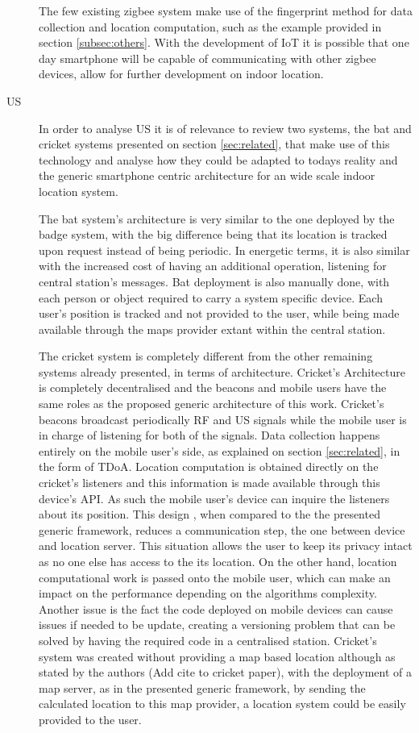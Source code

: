 \begin{description}
	The few existing zigbee system make use of the fingerprint method for data collection and location computation, such as the example provided in section \ref{subsec:others}. With the development of IoT it is possible that one day smartphone will be capable of communicating with other zigbee devices, allow for further development on indoor location.

\item[\ac{US}] 	In order to analyse \ac{US} it is of relevance to review two systems, the bat and cricket systems presented on section \ref{sec:related}, that make use of this technology and analyse how they could be adapted to todays reality and the generic smartphone centric architecture for an wide scale indoor location system.

	The bat system's architecture is very similar to the one deployed by the badge system, with the big difference being that its location is tracked upon request instead of being periodic. In energetic terms, it is also similar with the increased cost of having an additional operation, listening for central station's messages. Bat deployment is also manually done, with each person or object required to carry a system specific device. Each user's position is tracked and not provided to the user, while being made available through the maps provider extant within the central station.

	The cricket system is completely different from the other remaining systems already presented, in terms of architecture. Cricket's Architecture is completely decentralised and the beacons and mobile users have the same roles as the proposed generic architecture of this work. Cricket's beacons broadcast periodically RF and US signals while the mobile user is in charge of listening for both of the signals. Data collection happens entirely on the mobile user's side, as explained on section \ref{sec:related}, in the form of \ac{TDoA}. Location computation is obtained directly on the cricket's listeners and this information is made available through this device's API. As such the mobile user's device can inquire the listeners about its position. This design , when compared to the the presented generic framework, reduces a communication step, the one between device and location server. This situation allows the user to keep its privacy intact as no one else has access to the its location. On the other hand, location computational work is passed onto the mobile user, which can make an impact on the performance depending on the algorithms complexity. Another issue is the fact the code deployed on mobile devices can cause issues if needed to be update, creating a versioning problem that can be solved by having the required code in a centralised station. Cricket's system was created without providing a map based location although as stated by the authors (Add cite to cricket paper), with the deployment of a map server, as in the presented generic framework, by sending the calculated location to this map provider, a location system could be easily provided to the user.


\end{description}
